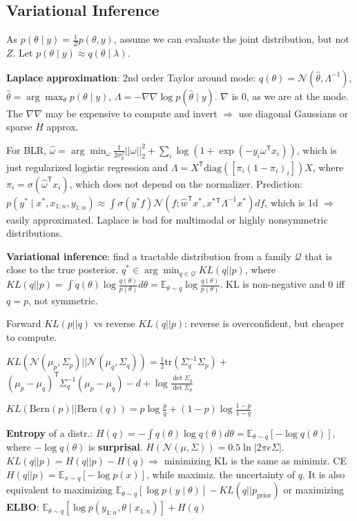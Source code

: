 \documentclass[11pt,landscape,a4paper,fleqn]{article}
\newcommand*{\tran}{^{\mathsf{T}}} %
\begin{document}
\begin{multicols*}{4}
\section{Variational Inference}

As \(p(\theta \mid y) = \frac{1}{Z} p(\theta, y)\), assume we can evaluate the joint distribution, but not \(Z\).
Let \(p(\theta \mid y) \approx q(\theta \mid \lambda)\).

\textbf{Laplace approximation}: 2nd order Taylor around mode:
\(q(\theta) = \mathcal{N}(\hat{\theta}, \Lambda^{-1})\), \(\hat{\theta} = \arg\max_\theta p(\theta\mid y)\),
\(\Lambda = - \nabla\nabla \log p(\hat{\theta} \mid y)\). \(\nabla\) is \(0\), as we are at the mode.
The \(\nabla \nabla\) may be expensive to compute and invert \( \Rightarrow \) use diagonal Gaussians or sparse \(H\) approx.

For BLR, \(\hat{\omega} = \arg\min_{\omega} \frac{1}{2\sigma_p^2} ||\omega||_2^2 + \sum_i \log(1 + \exp( - y_i \omega\tran x_i))\),
which is just regularized logistic regression and
\(\Lambda = X\tran \mathrm{diag}([\pi_i(1 - \pi_i)_i])X\),
where \(\pi_i = \sigma(\hat{\omega}\tran x_i)\), which does not depend on the normalizer.
Prediction: \(p(y^* \mid x^*, x_{1:n}, y_{1:n}) \approx \int \sigma(y^* f) \mathcal{N}(f; \hat{w}\tran x^*, x^*{}\tran \Lambda^{-1} x^*) df\),
which is 1d \( \Rightarrow \) easily approximated.
Laplace is bad for multimodal or highly nonsymmetric distributions.

\textbf{Variational inference}: find a tractable distribution from a family \(\mathcal{Q}\) that is close to the true posterior.
\(q^* \in \arg\min_{q \in \mathcal{Q}} KL(q || p)\),
where \(KL(q || p) = \int q(\theta) \log \frac{q(\theta)}{p(\theta)} d\theta = \mathbb{E}_{\theta \sim q} \log \frac{q(\theta)}{p(\theta)}\).
KL is non-negative and \(0\) iff \(q = p\), not symmetric.

Forward \(KL(p || q)\) vs reverse \(KL(q || p)\): reverse is overconfident, but cheaper to compute.

\(KL(\mathcal{N}(\mu_p, \Sigma_p) || \mathcal{N}(\mu_q, \Sigma_q)) = \frac{1}{2} \mathrm{tr}(\Sigma_q^{-1} \Sigma_p) + \)
\((\mu_p - \mu_q)\tran \Sigma_q^{-1} (\mu_p - \mu_q) - d + \log \frac{\det{\Sigma_q}}{\det{\Sigma_p}}\)

\(KL(\mathrm{Bern}(p) || \mathrm{Bern}(q)) = p \log \frac{p}{q} + (1 - p) \log \frac{1 - p}{1 - q}\)

\textbf{Entropy} of a distr.: \(H(q) = - \int q(\theta) \log q(\theta) d\theta = \mathbb{E}_{\theta \sim q} [ - \log q(\theta)]\),
where \( - \log q(\theta)\) is \textbf{surprisal}. \(H(\mathcal{N}(\mu, \Sigma)) = 0.5 \ln |2 \pi e \Sigma|\).
\(KL(q || p) = H(q || p) - H(q) \Rightarrow \) minimizing KL is the same as minimiz. CE \(H(q || p) = \mathbb{E}_{x \sim q}[ - \log p(x)]\),
while maximiz. the uncertainty of \(q\). It is also equivalent to maximizing \(\mathbb{E}_{\theta \sim q}[\log p(y \mid \theta)] - KL(q || p_{\mathrm{prior}})\) or maximizing
\textbf{ELBO}: \(\mathbb{E}_{\theta \sim q}[\log p(y_{1:n}, \theta \mid x_{1:n})] + H(q)\)


\end{multicols*}
\end{document}
